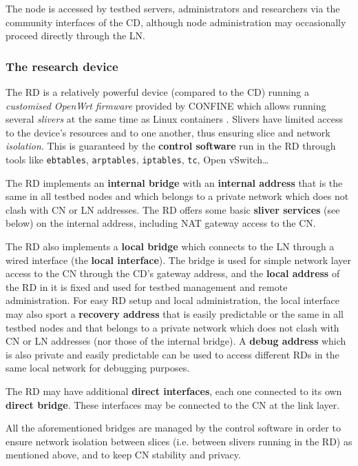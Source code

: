\documentclass[conference]{IEEEtran}
\begin{document}
The node is accessed by testbed servers, administrators and researchers via
the community interfaces of the CD, although node administration may
occasionally proceed directly through the LN.

\subsubsection{The research device}

The RD is a relatively powerful device (compared to the CD) running a
\emph{customised OpenWrt firmware} provided by CONFINE which allows running
several \emph{slivers} at the same time as Linux containers \cite{lxc}.
Slivers have limited access to the device's resources and to one another, thus
ensuring slice and network \emph{isolation}.  This is guaranteed by the
\textbf{control software} run in the RD through tools like \texttt{ebtables},
\texttt{arptables}, \texttt{iptables}, \texttt{tc}, Open vSwitch…


The RD implements an \textbf{internal bridge} with an \textbf{internal
  address} that is the same in all testbed nodes and which belongs to a
private network which does not clash with CN or LN addresses.  The RD offers
some basic \textbf{sliver services} (see below) on the internal address,
including NAT gateway access to the CN.

The RD also implements a \textbf{local bridge} which connects to the LN
through a wired interface (the \textbf{local interface}).  The bridge is used
for simple network layer access to the CN through the CD's gateway address,
and the \textbf{local address} of the RD in it is fixed and used for testbed
management and remote administration.  For easy RD setup and local
administration, the local interface may also sport a \textbf{recovery address}
that is easily predictable or the same in all testbed nodes and that belongs
to a private network which does not clash with CN or LN addresses (nor those
of the internal bridge).  A \textbf{debug address} which is also private and
easily predictable can be used to access different RDs in the same local
network for debugging purposes.

The RD may have additional \textbf{direct interfaces}, each one connected to
its own \textbf{direct bridge}.  These interfaces may be connected to the CN
at the link layer.

All the aforementioned bridges are managed by the control software in order to
ensure network isolation between slices (i.e. between slivers running in the
RD) as mentioned above, and to keep CN stability and privacy.
\end{document}
